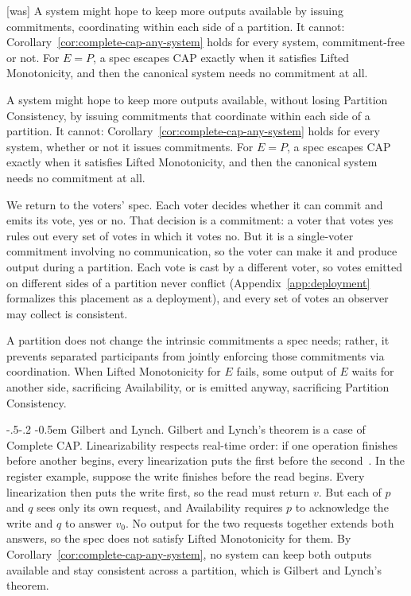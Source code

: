 \documentclass[sigconf]{cidr-2027}
\makeatletter
\theoremstyle{remark}
\renewcommand\paragraph{\@startsection{paragraph}{4}{\z@}%
  {-.5\baselineskip \@plus -2\p@ \@minus -.2\p@}%
  {-0.5em}%
  {\normalfont\bfseries}}
\newcommand{\commitment}{commitment\xspace}
\newcommand{\commitments}{commitments\xspace}
\newcommand{\outrel}{extends\xspace}          %
\makeatother
\begin{document}
{\footnotesize\color{black!50}\noindent\textsf{[was]} A system might hope to keep more outputs available by issuing \commitments,
coordinating within each side of a partition.  It cannot:
Corollary~\ref{cor:complete-cap-any-system} holds for every system,
\commitment-free or not.  For
$E=P$, a spec escapes CAP exactly when it satisfies Lifted Monotonicity, and
then the canonical system needs no \commitment at all.\par}

\color{blue!70!black}A system might hope to keep more outputs available, without losing Partition
Consistency, by issuing \commitments that coordinate within each side of a
partition.  It cannot: Corollary~\ref{cor:complete-cap-any-system} holds for
every system, whether or not it issues \commitments.  For
$E=P$, a spec escapes CAP exactly when it satisfies Lifted Monotonicity, and
then the canonical system needs no \commitment at all.\color{black}

We return to the voters' spec.  Each voter decides whether it can commit and emits
its vote, yes or no.  That decision is a \commitment: a voter that votes yes
rules out every set of votes in which it votes no.  But it is a single-voter
\commitment involving no communication, so the voter can make it and produce
output during a partition.  Each vote is cast by a different voter, so votes
emitted on different sides of a partition never conflict (Appendix~\ref{app:deployment} formalizes this placement as a deployment), and every
set of votes an observer may collect is consistent.

A partition does not change the intrinsic \commitments a spec needs; rather,
it prevents separated participants from jointly enforcing those \commitments
via coordination.  When Lifted
Monotonicity for $E$ fails, some output of $E$ waits for another side,
sacrificing Availability, or is emitted anyway, sacrificing Partition
Consistency.

\paragraph{Gilbert and Lynch.}
Gilbert and Lynch's theorem is a case of Complete CAP.  Linearizability
respects real-time order: if one operation finishes before another begins,
every linearization puts the first before the
second~\cite{herlihy1990linearizability}.  In the register example, suppose the
write finishes before the read begins.  Every linearization then puts the write
first, so the read must return $v$.  But each of $p$ and $q$ sees only its own
request, and Availability requires $p$ to acknowledge the write and $q$ to
answer $v_0$.  No output for the two requests together \outrel both answers, so
the spec does not satisfy Lifted Monotonicity for them.  By
Corollary~\ref{cor:complete-cap-any-system}, no system can keep both outputs
available and stay consistent across a partition, which is Gilbert and Lynch's
theorem.
\end{document}
